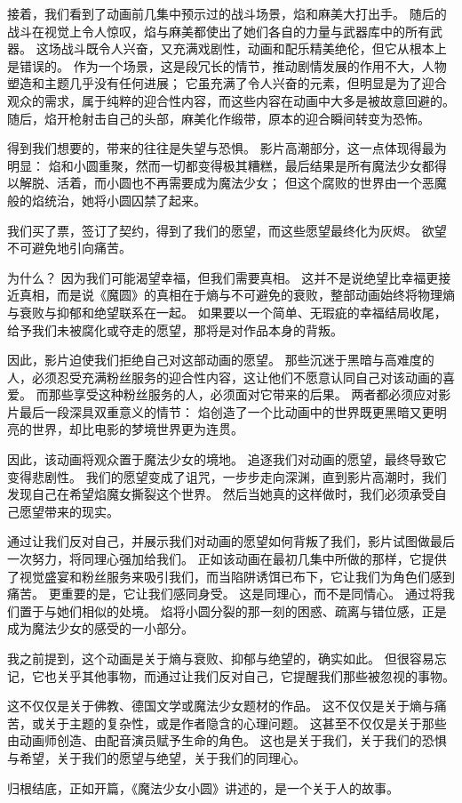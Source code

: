 接着，我们看到了动画前几集中预示过的战斗场景，焰和麻美大打出手。
随后的战斗在视觉上令人惊叹，焰与麻美都使出了她们各自的力量与武器库中的所有武器。
这场战斗既令人兴奋，又充满戏剧性，动画和配乐精美绝伦，但它从根本上是错误的。
作为一个场景，这是段冗长的情节，推动剧情发展的作用不大，人物塑造和主题几乎没有任何进展；
它虽充满了令人兴奋的元素，但明显是为了迎合观众的需求，属于纯粹的迎合性内容，而这些内容在动画中大多是被故意回避的。
随后，焰开枪射击自己的头部，麻美化作缎带，原本的迎合瞬间转变为恐怖。

得到我们想要的，带来的往往是失望与恐惧。
影片高潮部分，这一点体现得最为明显：
焰和小圆重聚，然而一切都变得极其糟糕，最后结果是所有魔法少女都得以解脱、活着，而小圆也不再需要成为魔法少女；
但这个腐败的世界由一个恶魔般的焰统治，她将小圆囚禁了起来。

我们买了票，签订了契约，得到了我们的愿望，而这些愿望最终化为灰烬。
欲望不可避免地引向痛苦。

为什么？
因为我们可能渴望幸福，但我们需要真相。
这并不是说绝望比幸福更接近真相，而是说《魔圆》的真相在于熵与不可避免的衰败，整部动画始终将物理熵与衰败与抑郁和绝望联系在一起。
如果要以一个简单、无瑕疵的幸福结局收尾，给予我们未被腐化或夺走的愿望，那将是对作品本身的背叛。

因此，影片迫使我们拒绝自己对这部动画的愿望。
那些沉迷于黑暗与高难度的人，必须忍受充满粉丝服务的迎合性内容，这让他们不愿意认同自己对该动画的喜爱。
而那些享受这种粉丝服务的人，必须面对它带来的后果。
两者都必须应对影片最后一段深具双重意义的情节：
焰创造了一个比动画中的世界既更黑暗又更明亮的世界，却比电影的梦境世界更为连贯。

因此，该动画将观众置于魔法少女的境地。
追逐我们对动画的愿望，最终导致它变得悲剧性。
我们的愿望变成了诅咒，一步步走向深渊，直到影片高潮时，我们发现自己在希望焰魔女撕裂这个世界。
然后当她真的这样做时，我们必须承受自己愿望带来的现实。

通过让我们反对自己，并展示我们对动画的愿望如何背叛了我们，影片试图做最后一次努力，将同理心强加给我们。
正如该动画在最初几集中所做的那样，它提供了视觉盛宴和粉丝服务来吸引我们，而当陷阱诱饵已布下，它让我们为角色们感到痛苦。
更重要的是，它让我们感同身受。
这是同理心，而不是同情心。
通过将我们置于与她们相似的处境。
焰将小圆分裂的那一刻的困惑、疏离与错位感，正是成为魔法少女的感受的一小部分。

我之前提到，这个动画是关于熵与衰败、抑郁与绝望的，确实如此。
但很容易忘记，它也关乎其他事物，而通过让我们反对自己，它提醒我们那些被忽视的事物。

这不仅仅是关于佛教、德国文学或魔法少女题材的作品。
这不仅仅是关于熵与痛苦，或关于主题的复杂性，或是作者隐含的心理问题。
这甚至不仅仅是关于那些由动画师创造、由配音演员赋予生命的角色。
这也是关于我们，关于我们的恐惧与希望，关于我们的愿望与绝望，关于我们的同理心。

归根结底，正如开篇，《魔法少女小圆》讲述的，是一个关于人的故事。